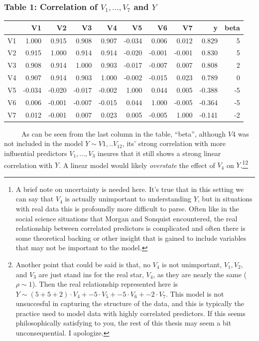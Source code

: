 \documentclass[12pt,twoside]{reedthesis}
\begin{document}
  \subsubsection{\texorpdfstring{Table 1: Correlation of \(V_1,..., V_7\)
  and
  \(Y\)}{Table 1: Correlation of V\_1,..., V\_7 and Y}}\label{table-1-correlation-of-v_1...-v_7-and-y}
  
  \begin{longtable}[]{@{}lrrrrrrrrr@{}}
  \toprule
  & V1 & V2 & V3 & V4 & V5 & V6 & V7 & y & beta\tabularnewline
  \midrule
  \endhead
  V1 & 1.000 & 0.915 & 0.908 & 0.907 & -0.034 & 0.006 & 0.012 & 0.829 &
  5\tabularnewline
  V2 & 0.915 & 1.000 & 0.914 & 0.914 & -0.020 & -0.001 & -0.001 & 0.830 &
  5\tabularnewline
  V3 & 0.908 & 0.914 & 1.000 & 0.903 & -0.017 & -0.007 & 0.007 & 0.808 &
  2\tabularnewline
  V4 & 0.907 & 0.914 & 0.903 & 1.000 & -0.002 & -0.015 & 0.023 & 0.789 &
  0\tabularnewline
  V5 & -0.034 & -0.020 & -0.017 & -0.002 & 1.000 & 0.044 & 0.005 & -0.388
  & -5\tabularnewline
  V6 & 0.006 & -0.001 & -0.007 & -0.015 & 0.044 & 1.000 & -0.005 & -0.364
  & -5\tabularnewline
  V7 & 0.012 & -0.001 & 0.007 & 0.023 & 0.005 & -0.005 & 1.000 & -0.141 &
  -2\tabularnewline
  \bottomrule
  \end{longtable}
  
  ~~~~~As can be seen from the last column in the table, ``beta'',
  although \(V4\) was not included in the model \(Y \sim V1,..V_{12}\),
  its' strong correlation with more influential predictors \(V_1,...,V_3\)
  insures that it still shows a strong linear correlation with \(Y\). A
  linear model would likely \emph{overstate} the effect of \(V_4\) on
  \(Y\).\footnote{A brief note on uncertainty is needed here. It's true
    that in this setting we can say that \(V_4\) is actually unimportant
    to understanding \(Y\), but in situations with real data this is
    profoundly more difficult to parse. Often like in the social science
    situations that Morgan and Sonquist encountered, the real relationship
    between correlated predictors is complicated and often there is some
    theoretical backing or other insight that is gained to include
    variables that may not be important to the model.}\footnote{Another
    point that could be said is that, no \(V_4\) is not unimportant,
    \(V_1, V_2,\) and \(V_3\) are just stand ins for the real star,
    \(V_4\), as they are nearly the same (\(\rho \sim 1\)). Then the real
    relationship represented here is
    \(Y \sim (5 + 5 + 2) \cdot V_4 + -5 \cdot V_5 + -5 \cdot V_6 + -2 \cdot V_7\).
    This model is not unsuccesful in capturing the structure of the data,
    and this is typically the practice used to model data with highly
    correlated predictors. If this seems philosophically satisfying to
    you, the rest of this thesis may seem a bit unconsequential. I
    apologize.}
  
\end{document}
